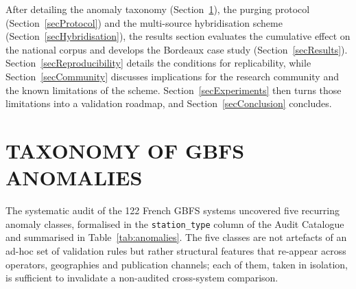\documentclass[a4paper,twoside]{article}
\begin{document}
After detailing the anomaly taxonomy (Section~\ref{secAudit}), the
purging protocol (Section~\ref{secProtocol}) and the multi-source
hybridisation scheme (Section~\ref{secHybridisation}), the
results section evaluates the cumulative effect on the national
corpus and develops the Bordeaux case study
(Section~\ref{secResults}). Section~\ref{secReproducibility}
details the conditions for replicability, while
Section~\ref{secCommunity} discusses implications for the
research community and the known limitations of the scheme.
Section~\ref{secExperiments} then turns those limitations into a
validation roadmap, and Section~\ref{secConclusion} concludes.

\section{\uppercase{Taxonomy of GBFS Anomalies}}
\label{secAudit}

The systematic audit of the 122 French GBFS systems uncovered
five recurring anomaly classes, formalised in the
\texttt{station\_type} column of the Audit Catalogue and summarised
in Table~\ref{tab:anomalies}. The five classes are not artefacts
of an ad-hoc set of validation rules but rather structural
features that re-appear across operators, geographies and
publication channels; each of them, taken in isolation, is
sufficient to invalidate a non-audited cross-system comparison.
\end{document}
